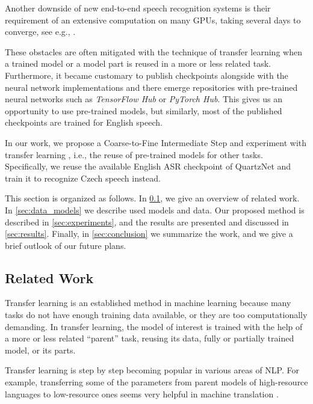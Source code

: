 Another downside of new end-to-end speech recognition systems is their requirement of an extensive computation on many GPUs, taking several days to converge, see e.g., . 

These obstacles are often mitigated with the technique of transfer learning  when a trained model or a model part is reused in a more or less related task.
Furthermore, it became customary to publish checkpoints alongside with the neural network implementations and 
there emerge repositories with pre-trained neural networks such as \textit{TensorFlow Hub} or \textit{PyTorch
	Hub}. This gives us an opportunity to use pre-trained models, but similarly, most of the published checkpoints are trained for English speech.

In our work, we propose a Coarse-to-Fine Intermediate Step and experiment with transfer learning , i.e., the reuse of pre-trained models for other tasks. Specifically,
we reuse the available English ASR checkpoint of QuartzNet  and train it to recognize Czech speech instead.

This section is organized as follows. In \cref{asr:related_work}, we give an overview of related work. In \cref{sec:data_models} we describe used models and data. Our proposed method is described in \cref{sec:experiments}, and the results are presented and discussed in \cref{sec:results}.
Finally, in \cref{sec:conclusion} we summarize the work, and we give a brief outlook of our future plans.


\subsection{Related Work}
\label{asr:related_work}

Transfer learning  is an established method in machine learning because many tasks do not have enough training data available, or they are too computationally demanding. In transfer learning, the model of interest is trained with the help of a more or less related ``parent'' task, reusing its data, fully or partially trained model, or its parts.

Transfer learning is step by step becoming popular in various areas of NLP. 
For example, transferring some of the parameters from parent models of high-resource languages to low-resource ones seems very helpful in machine translation .

